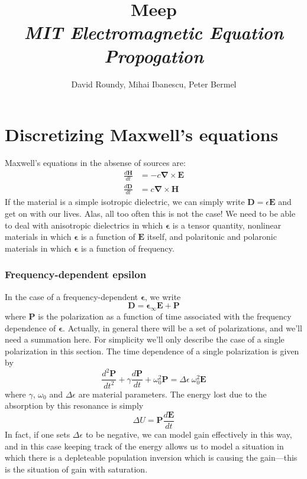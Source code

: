 \documentclass[floats]{book}
\begin{document}
\title{
    Meep\\
{\Large \it MIT Electromagnetic Equation Propogation}
}
\author{
    David Roundy, Mihai Ibanescu, Peter Bermel
}

\maketitle 

\tableofcontents

\chapter{Discretizing Maxwell's equations}

Maxwell's equations in the absense of sources are:
\begin{align}
\frac{d\mathbf H}{dt} &= -c \mathbf \nabla \times \mathbf E\\
\frac{d\mathbf D}{dt} &= c \mathbf \nabla \times \mathbf H
\end{align}
If the material is a simple isotropic dielectric, we can simply write
$\mathbf D = \epsilon \mathbf E$ and get on with our lives.  Alas, all too
often this is not the case!  We need to be able to deal with anisotropic
dielectrics in which $\mathbf \epsilon$ is a tensor quantity, nonlinear
materials in which $\mathbf \epsilon$ is a function of $\mathbf E$ itself,
and polaritonic and polaronic materials in which $\mathbf \epsilon$ is a
function of frequency.

\subsection{Frequency-dependent epsilon}

In the case of a frequency-dependent $\mathbf \epsilon$, we write
\begin{equation}
\mathbf D = \mathbf \epsilon_{\infty} \mathbf E + \mathbf P
\end{equation}
where $\mathbf P$ is the polarization as a function of time associated with
the frequency dependence of $\mathbf \epsilon$.  Actually, in general there
will be a set of polarizations, and we'll need a summation here.  For
simplicity we'll only describe the case of a single polarization in this
section.  The time dependence of a single polarization is given by
\begin{equation}
\frac{d^2\mathbf{P}}{dt^2} + \gamma \frac{d\mathbf{P}}{dt}
+ \omega_0^2 \mathbf{P} = \Delta\epsilon\ \omega_0^2 \mathbf{E}
\end{equation}
where $\gamma$, $\omega_0$ and $\Delta\epsilon$ are material parameters.
The energy lost due to the absorption by this resonance is simply
\begin{equation}
\Delta U = \mathbf P \frac{d\mathbf E}{dt}
\end{equation}
In fact, if one sets $\Delta\epsilon$ to be negative, we can model gain
effectively in this way, and in this case keeping track of the energy
allows us to model a situation in which there is a depleteable population
inversion which is causing the gain---this is the situation of gain with
saturation.
\end{document}
